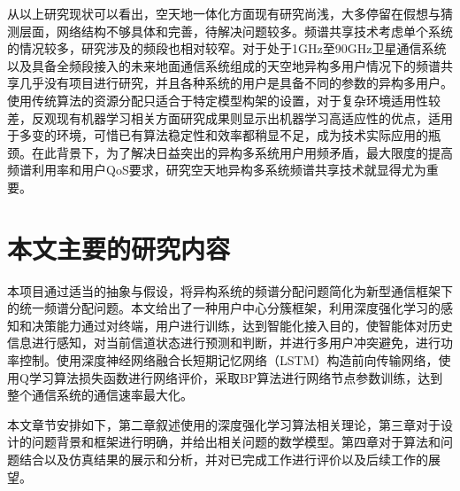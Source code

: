 从以上研究现状可以看出，空天地一体化方面现有研究尚浅，大多停留在假想与猜测层面，网络结构不够具体和完善，待解决问题较多。频谱共享技术考虑单个系统的情况较多，研究涉及的频段也相对较窄。对于处于1GHz至90GHz卫星通信系统以及具备全频段接入的未来地面通信系统组成的天空地异构多用户情况下的频谱共享几乎没有项目进行研究，并且各种系统的用户是具备不同的参数的异构多用户。使用传统算法的资源分配只适合于特定模型构架的设置，对于复杂环境适用性较差，反观现有机器学习相关方面研究成果则显示出机器学习高适应性的优点，适用于多变的环境，可惜已有算法稳定性和效率都稍显不足，成为技术实际应用的瓶颈。在此背景下，为了解决日益突出的异构多系统用户用频矛盾，最大限度的提高频谱利用率和用户QoS要求，研究空天地异构多系统频谱共享技术就显得尤为重要。

\section{本文主要的研究内容}

本项目通过适当的抽象与假设，将异构系统的频谱分配问题简化为新型通信框架下的统一频谱分配问题。本文给出了一种用户中心分簇框架，利用深度强化学习的感知和决策能力通过对终端，用户进行训练，达到智能化接入目的，使智能体对历史信息进行感知，对当前信道状态进行预测和判断，并进行多用户冲突避免，进行功率控制。使用深度神经网络融合长短期记忆网络（LSTM）构造前向传输网络，使用Q学习算法损失函数进行网络评价，采取BP算法进行网络节点参数训练，达到整个通信系统的通信速率最大化。

本文章节安排如下，第二章叙述使用的深度强化学习算法相关理论，第三章对于设计的问题背景和框架进行明确，并给出相关问题的数学模型。第四章对于算法和问题结合以及仿真结果的展示和分析，并对已完成工作进行评价以及后续工作的展望。